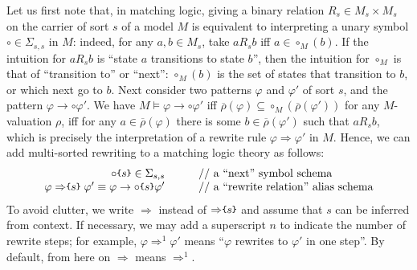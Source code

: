 \documentclass[UTF8,11pt]{article}
\theoremstyle{plain}
\theoremstyle{definition}
\theoremstyle{remark}
\newcommand{\parametric}[2]{{#1}\raisebox{.2ex}{\texttt{\footnotesize{\{}}}#2\raisebox{.2ex}{\texttt{\footnotesize{\}}}}}
\newcommand{\ra}{\rightarrow}
\begin{document}
Let us first note that, in matching logic, giving a binary relation
$R_s \in M_s \times M_s$ on the carrier of sort $s$ of a model $M$
is equivalent to interpreting a unary symbol $\circ \in \Sigma_{s,s}$ in $M$:
indeed, for any $a,b\in M_s$, take $a\mathrel{R_s} b$ iff $a \in \circ_M(b)$.
If the intuition for $a \mathrel{R_s} b$ is ``state $a$ transitions to
state $b$'', then the intuition for $\circ_M$ is that of ``transition to''
or ``next'':
$\circ_M(b)$ is the set of states that transition to $b$, or which next go
to $b$.
Next consider two patterns $\varphi$ and $\varphi'$ of sort $s$, and the
pattern $\varphi \ra \circ \varphi'$.
We have $M \models \varphi \ra \circ \varphi'$ iff
$\overline{\rho}(\varphi) \subseteq \circ_M(\overline{\rho}(\varphi'))$
for any $M$-valuation $\rho$, iff for any $a\in\overline{\rho}(\varphi)$
there is some $b \in \overline{\rho}(\varphi')$ such that $a\mathrel{R_s}b$,
which is precisely the interpretation of a rewrite rule
$\varphi \Rightarrow \varphi'$ in $M$.
Hence, we can add multi-sorted rewriting to a matching logic theory
as follows:
$$
\begin{array}{r@{\hspace*{7ex}}l}
\parametric{\circ}{s} \in \Sigma_{s,s}
& \textrm{// a ``next'' symbol schema}
\\
\varphi\mathrel{\parametric{\Rightarrow}{s}}\varphi'
\equiv \varphi \rightarrow \parametric{\circ}{s} \varphi'
& \textrm{// a ``rewrite relation'' alias schema}
\end{array}
$$
To avoid clutter, we write $\Rightarrow$ instead of
$\parametric{\Rightarrow}{s}$ and assume that $s$ can be inferred from
context.
If necessary, we may add a superscript $n$ to indicate the number of rewrite steps;
for example, $\varphi \Rightarrow^1 \varphi'$ means
``$\varphi$ rewrites to $\varphi'$ in one step''.
By default, from here on $\Rightarrow$ means $\Rightarrow^1$.
\end{document}
